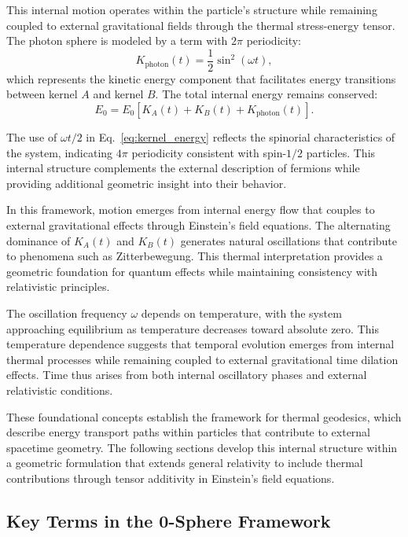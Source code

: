 \documentclass[%
 reprint,
 amsmath,amssymb,
 aps,
]{revtex4-1}
\numberwithin{equation}{section}%
\begin{document}
This internal motion operates within the particle's structure while remaining coupled to external gravitational fields through the thermal stress-energy tensor. The photon sphere is modeled by a term with $2\pi$ periodicity:
\begin{equation} \label{eq:photon_sphere}
K_{\text{photon}}(t) = \frac{1}{2} \sin^2(\omega t),
\end{equation}
which represents the kinetic energy component that facilitates energy transitions between kernel $A$ and kernel $B$. The total internal energy remains conserved:
\begin{equation} \label{eq:total_energy}
E_0 = E_0 \left[ K_A(t) + K_B(t) + K_{\text{photon}}(t) \right].
\end{equation}

The use of $\omega t / 2$ in Eq.~\eqref{eq:kernel_energy} reflects the spinorial characteristics of the system, indicating $4\pi$ periodicity consistent with spin-$1/2$ particles. This internal structure complements the external description of fermions while providing additional geometric insight into their behavior.

In this framework, motion emerges from internal energy flow that couples to external gravitational effects through Einstein's field equations. The alternating dominance of $K_A(t)$ and $K_B(t)$ generates natural oscillations that contribute to phenomena such as Zitterbewegung. This thermal interpretation provides a geometric foundation for quantum effects while maintaining consistency with relativistic principles.

The oscillation frequency $\omega$ depends on temperature, with the system approaching equilibrium as temperature decreases toward absolute zero. This temperature dependence suggests that temporal evolution emerges from internal thermal processes while remaining coupled to external gravitational time dilation effects. Time thus arises from both internal oscillatory phases and external relativistic conditions.

These foundational concepts establish the framework for thermal geodesics, which describe energy transport paths within particles that contribute to external spacetime geometry. The following sections develop this internal structure within a geometric formulation that extends general relativity to include thermal contributions through tensor additivity in Einstein's field equations.

\subsection{Key Terms in the 0-Sphere Framework}
\end{document}
